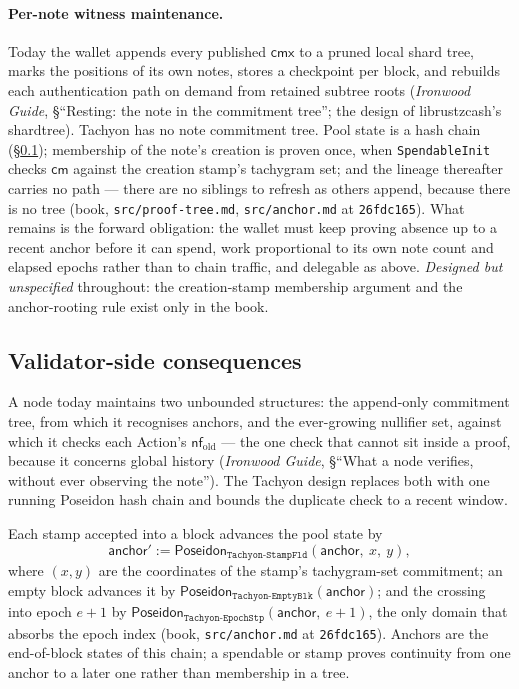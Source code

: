 \documentclass[11pt,a4paper]{article}
\theoremstyle{definition}
\newcommand{\nfsym}{\mathsf{nf}}
\newcommand{\cmsym}{\mathsf{cm}}
\newcommand{\cmx}{\mathsf{cmx}}
\begin{document}
\paragraph{Per-note witness maintenance.} Today the wallet appends every
published $\cmx$ to a pruned local shard tree, marks the positions of its own
notes, stores a checkpoint per block, and rebuilds each authentication path
on demand from retained subtree roots (\emph{Ironwood Guide}, \S``Resting: the
note in the commitment tree''; the design of
librustzcash's \textsf{shardtree}). Tachyon has no note commitment tree.
Pool state is a hash chain (\S\ref{sec:tachyon-validators}); membership of
the note's creation is proven once, when \texttt{SpendableInit} checks
$\cmsym$ against the creation stamp's tachygram set; and the lineage
thereafter carries no path --- there are no siblings to refresh as others
append, because there is no tree (book, \texttt{src/proof-tree.md},
\texttt{src/anchor.md} at \texttt{26fdc165}). What remains is the forward
obligation: the wallet must keep proving absence up to a recent anchor
before it can spend, work proportional to its own note count and elapsed
epochs rather than to chain traffic, and delegable as above. \emph{Designed
but unspecified} throughout: the creation-stamp membership argument and the
anchor-rooting rule exist only in the book.

\subsection{Validator-side consequences}\label{sec:tachyon-validators}

A node today maintains two unbounded structures: the append-only commitment
tree, from which it recognises anchors, and the ever-growing nullifier set,
against which it checks each Action's $\nfsym_{\mathrm{old}}$ --- the one
check that cannot sit inside a proof, because it concerns global history
(\emph{Ironwood Guide}, \S``What a node verifies, without ever observing the
note''). The Tachyon design replaces both with one running Poseidon hash
chain and bounds the duplicate check to a recent window.

Each stamp accepted into a block advances the pool state by
\[
\mathsf{anchor}' :=
  \mathsf{Poseidon}_{\texttt{Tachyon-StampFld}}(\mathsf{anchor},\ x,\ y),
\]
where $(x, y)$ are the coordinates of the stamp's tachygram-set commitment;
an empty block advances it by
$\mathsf{Poseidon}_{\texttt{Tachyon-EmptyBlk}}(\mathsf{anchor})$; and the
crossing into epoch $e + 1$ by
$\mathsf{Poseidon}_{\texttt{Tachyon-EpochStp}}\allowbreak(\mathsf{anchor},\
e + 1)$,
the only domain that absorbs the epoch index (book, \texttt{src/anchor.md}
at \texttt{26fdc165}). Anchors are the end-of-block states of this chain; a
spendable or stamp proves continuity from one anchor to a later one rather
than membership in a tree.
\end{document}
